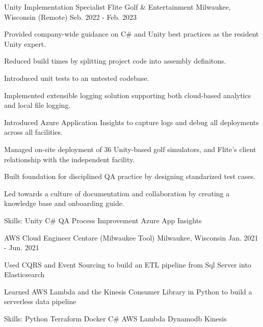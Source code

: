 \begin{cventries}
  \cventry
    {Unity Implementation Specialist} %
    {Flite Golf \& Entertainment} %
    {Milwaukee, Wisconsin (Remote)} %
    {Seb. 2022 - Feb. 2023} %
    {
      \begin{cvitems} %
        \item {Provided company-wide guidance on C\# and Unity best practices as the resident Unity expert.}
        \item {Reduced build times by splitting project code into assembly definitons.}
        \item {Introduced unit tests to an untested codebase.}
        \item {Implemented extensible logging solution supporting both cloud-based analytics and local file logging.}
        \item {Introduced Azure Application Insights to capture logs and debug all deployments across all facilities.}
        \item {Managed on-site deployment of 36 Unity-based golf simulators, and Flite's client relationship with the independent facility.}
        \item {Built foundation for disciplined QA practice by designing standarized test cases.}
        \item {Led towards a culture of documentation and collaboration by creating a knowledge base and onboarding guide.}
        \item {Skills: Unity \textbullet{} C\# \textbullet{} QA Process Improvement \textbullet{} Azure App Insights}
      \end{cvitems}
    }

  \cventry
    {AWS Cloud Engineer} %
    {Centare (Milwaukee Tool)} %
    {Milwaukee, Wisconsin} %
    {Jan. 2021 - Jun. 2021} %
    {
      \begin{cvitems} %
        \item {Used CQRS and Event Sourcing to build an ETL pipeline from Sql Server into Elasticsearch}
        \item {Learned AWS Lambda and the Kinesis Consumer Library in Python to build a serverless data pipeline}
        \item {Skills: Python \textbullet{} Terraform \textbullet{} Docker \textbullet{} C\# \textbullet{} AWS Lambda \textbullet{} Dynamodb \textbullet{} Kinesis}
      \end{cvitems}
    }


\end{cventries}
